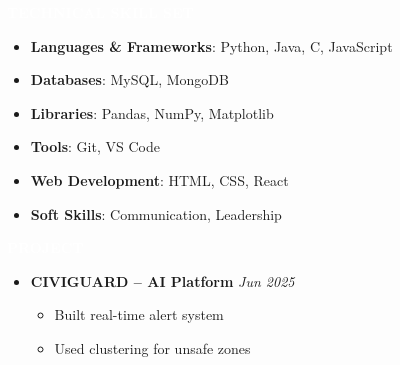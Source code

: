 \documentclass[a4paper,10pt]{article}
\newcommand{\resheading}[1]{%
  \par\vspace{8pt}\noindent
  {\colorbox{resgray}{\textcolor{white}{\textbf{\sffamily\hspace{6pt}#1\hspace{6pt}}}}}%
  \par\vspace{4pt}%
}
\begin{document}
\resheading{TECHNICAL SKILL SET}
\begin{itemize}[leftmargin=2em]

\item \textbf{Languages \& Frameworks}: Python, Java, C, JavaScript

\item \textbf{Databases}: MySQL, MongoDB

\item \textbf{Libraries}: Pandas, NumPy, Matplotlib

\item \textbf{Tools}: Git, VS Code

\item \textbf{Web Development}: HTML, CSS, React

\item \textbf{Soft Skills}: Communication, Leadership

\end{itemize}
\par\vspace{0.35em}


\resheading{PROJECT}
\begin{itemize}[leftmargin=2em]

\item \textbf{CIVIGUARD – AI Platform} \hfill \textit{Jun 2025}

\begin{itemize}

\item Built real-time alert system

\item Used clustering for unsafe zones

\end{itemize}


\end{itemize}
\par\vspace{0.35em}
\end{document}
